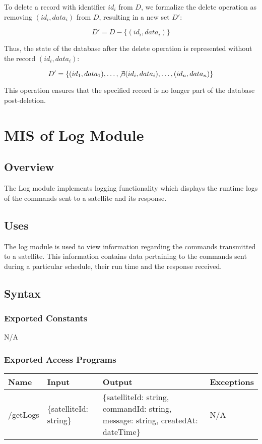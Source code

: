 \documentclass[12pt, titlepage]{article}
\begin{document}
To delete a record with identifier $id_i$ from $D$, we formalize the delete operation as removing $(id_i, data_i)$ from $D$, resulting in a new set $D'$:

\[
D' = D - \{(id_i, data_i)\}
\]

Thus, the state of the database after the delete operation is represented without the record $(id_i, data_i)$:

\[
D' = \{(id_1, data_1), \ldots, \not\exists(id_i, data_i), \ldots, (id_n, data_n)\}
\]

This operation ensures that the specified record is no longer part of the database post-deletion.


\section{MIS of Log Module} \label{Module}

\subsection{ Overview}

The Log module implements logging functionality which displays the runtime logs of the commands sent to a satellite and its response.

\subsection{ Uses}

The log module is used to view information regarding the commands transmitted to a satellite. This information contains data pertaining to the commands sent during a particular schedule, their run time and the response received. 

\subsection{ Syntax}

\subsubsection{ Exported Constants}

N/A

\subsubsection{Exported Access Programs}
\begin{center}
\begin{tabular}{p{2cm} p{4cm} p{4cm} p{4cm}}
\hline
\textbf{Name} & \textbf{Input} & \textbf{Output} & \textbf{Exceptions} \\
\hline
/getLogs & \{satelliteId: string\} & \{satelliteId: string, commandId: string, message: string, createdAt: dateTime\} & N/A \\
\hline

\end{tabular}

\end{center}
\end{document}
